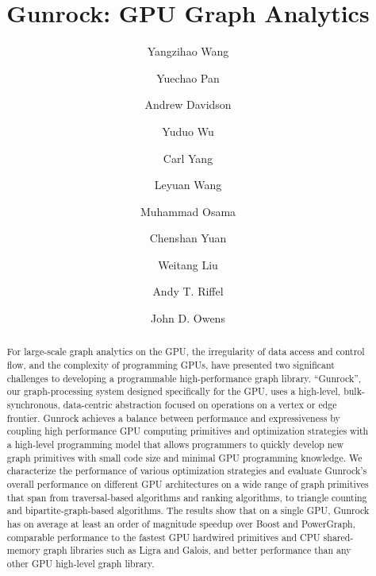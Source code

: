 \documentclass[format=acmsmall,review=false,screen=true]{acmart}
\begin{document}
\title{Gunrock: GPU Graph Analytics}
\author{Yangzihao Wang}
\author{Yuechao Pan}
\author{Andrew Davidson}
\author{Yuduo Wu}
\author{Carl Yang}
\author{Leyuan Wang}
\author{Muhammad Osama}
\author{Chenshan Yuan}
\author{Weitang Liu}
\author{Andy T. Riffel}
\author{John D. Owens}

\begin{abstract}
For large-scale graph analytics on the GPU, the irregularity of data
access and control flow, and the complexity of programming GPUs, have
presented two significant challenges to developing a programmable
high-performance graph library. ``Gunrock'', our graph-processing
system designed specifically for the GPU, uses a high-level,
bulk-synchronous, data-centric abstraction focused on operations on a
vertex or edge frontier. Gunrock achieves a balance between
performance and expressiveness by coupling high performance GPU
computing primitives and optimization strategies with a high-level
programming model that allows programmers to quickly develop new graph
primitives with small code size and minimal GPU programming knowledge.
We characterize the performance of various optimization strategies and
evaluate Gunrock's overall performance on different GPU architectures
on a wide range of graph primitives that span from traversal-based
algorithms and ranking algorithms, to triangle counting and
bipartite-graph-based algorithms. The results show that on a single
GPU, Gunrock has on average at least an order of magnitude speedup
over Boost and PowerGraph, comparable performance to the fastest GPU
hardwired primitives and CPU shared-memory graph libraries such as
Ligra and Galois, and better performance than any other GPU high-level
graph library.
\end{abstract}
\end{document}
